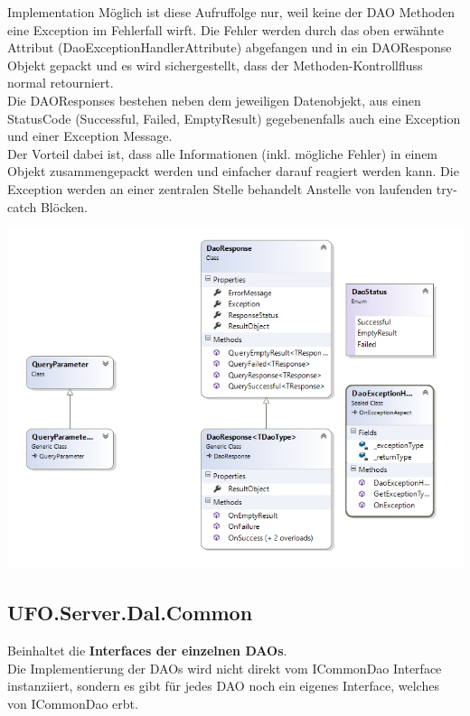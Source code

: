 \begin{section}{Implementation}
Möglich ist diese Aufruffolge nur, weil keine der DAO Methoden eine Exception im Fehlerfall wirft.
Die Fehler werden durch das oben erwähnte Attribut (DaoExceptionHandlerAttribute) abgefangen und in ein DAOResponse Objekt gepackt und es wird sichergestellt, dass der Methoden-Kontrollfluss normal retourniert. \\
Die DAOResponses bestehen neben dem jeweiligen Datenobjekt, aus einen StatusCode (Successful, Failed, EmptyResult) gegebenenfalls auch eine Exception und einer Exception Message. \\
Der Vorteil dabei ist, dass alle Informationen (inkl. mögliche Fehler) in einem Objekt zusammengepackt werden und einfacher darauf reagiert werden kann. Die Exception werden an einer zentralen Stelle behandelt Anstelle von laufenden try-catch Blöcken.

\includegraphics[angle=0, scale=0.45]{./img/DaoResponse.jpg}
\FloatBarrier

\subsection{UFO.Server.Dal.Common}
Beinhaltet die \textbf{Interfaces der einzelnen DAOs}. \\
Die Implementierung der DAOs wird nicht direkt vom ICommonDao Interface instanziiert, sondern es gibt für jedes DAO noch ein eigenes Interface, welches von ICommonDao erbt. \\


\end{section}
